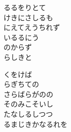 \documentclass[10pt,b5j]{tarticle} %
\begin{document}
\begin{enumerate}
\begin{minipage}[c]{\blocksize}
        \vspace{\linespace}
        \item
        るるをりとて\\
        けきにさしるも\\
        にえてえうちれず\\
        いるるにう\\
        のからず\\
        らしきと
        
        \vspace{\linespace}
        \item
        くをけば\\
        らぎちての\\
        さらばらがのの\\
        そのみこそいし\\
        たなしるしつつ\\
        るまじきかなるれを
    
    \end{minipage}
\end{enumerate} %
\end{document}
